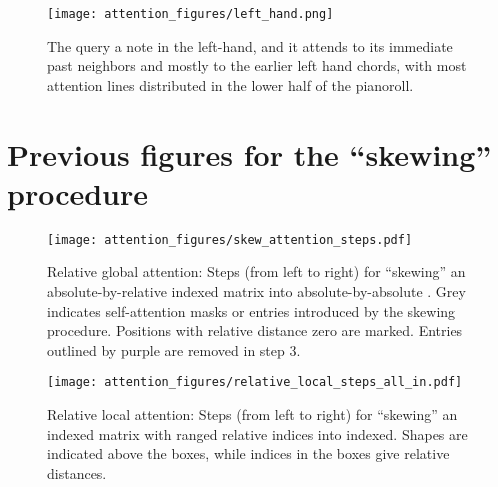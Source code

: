 \documentclass{article} \usepackage{iclr2019_conference,times}
\begin{document}
\begin{figure}[H]
\vskip -0.1in
\begin{center}
\centerline{\texttt{[image: attention\_figures/left\_hand.png]}}
\caption{The query a note in the left-hand, and it attends to its immediate past neighbors and mostly to the earlier left hand chords, with most attention lines distributed in the lower half of the pianoroll.}
\label{fig:triangle}
\end{center}
\vskip -0.1in
\end{figure}


\section{Previous figures for the ``skewing'' procedure}
\label{previous_skew}
\begin{figure}[H]
\vskip -0.05in
\begin{center}
\centerline{\texttt{[image: attention\_figures/skew\_attention\_steps.pdf]}}
\caption{Relative global attention: Steps (from left to right) for ``skewing'' an absolute-by-relative   indexed matrix into absolute-by-absolute . Grey indicates self-attention masks or entries introduced by the skewing procedure.  Positions with relative distance zero are marked. Entries outlined by purple are removed in step 3.}
\label{fig:skew}
\end{center}
\vskip -0.2in
\end{figure}


\begin{figure}[H]
\vskip -0.05in
\begin{center}
\centerline{\texttt{[image: attention\_figures/relative\_local\_steps\_all\_in.pdf]}}
\caption{Relative local attention: Steps (from left to right) for ``skewing'' an  indexed matrix with  ranged relative indices  into  indexed.  Shapes are indicated above the boxes, while indices in the boxes give relative distances.}
\label{fig:local_skew}
\end{center}
\vskip -0.2in
\end{figure}
\end{document}
